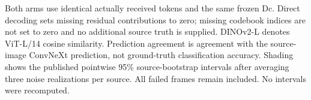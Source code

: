 Both arms use identical actually received tokens and the same frozen Dc. Direct decoding sets missing residual contributions to zero; missing codebook indices are not set to zero and no additional source truth is supplied. DINOv2-L denotes ViT-L/14 cosine similarity. Prediction agreement is agreement with the source-image ConvNeXt prediction, not ground-truth classification accuracy. Shading shows the published pointwise 95\% source-bootstrap intervals after averaging three noise realizations per source. All failed frames remain included. No intervals were recomputed.
